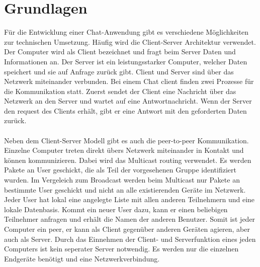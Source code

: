 \section{Grundlagen}
Für die Entwicklung einer Chat-Anwendung gibt es verschiedene Möglichkeiten zur technischen Umsetzung.
Häufig wird die Client-Server Architektur verwendet. 
Der Computer wird als Client bezeichnet und fragt beim Server Daten und Informationen an. 
Der Server ist ein leistungsstarker Computer, welcher Daten speichert und sie auf Anfrage zurück gibt.
Client und Server sind über das Netzwerk miteinander verbunden. 
Bei einem Chat client finden zwei Prozesse für die Kommunikation statt.
Zuerst sendet der Client eine Nachricht über das Netzwerk an den Server und wartet auf eine Antwortnachricht. 
Wenn der Server den request des Clients erhält, gibt er eine Antwort mit den geforderten Daten zurück. 
\cite{tanenbaum96}
\\
\\
Neben dem Client-Server Modell gibt es auch die peer-to-peer Kommunikation.
Einzelne Computer treten direkt übers Netzwerk miteinander in Kontakt und können kommunizieren.
Dabei wird das Multicast routing verwendet. Es werden Pakete an User geschickt, die als Teil der vorgesehenen Gruppe identifiziert wurden.
Im Vergeleich zum Broadcast werden beim Multicast nur Pakete an bestimmte User geschickt und nicht an alle existierenden Geräte im Netzwerk.
Jeder User hat lokal eine angelegte Liste mit allen anderen Teilnehmern und eine lokale Datenbasis. 
Kommt ein neuer User dazu, kann er einen beliebigen Teilnehmer anfragen und erhält die Namen der anderen Benutzer. 
Somit ist jeder Computer ein peer, er kann als Client gegenüber anderen Geräten agieren, aber auch als Server.
Durch das Einnehmen der Client- und Serverfunktion eines jeden Computers ist kein seperater Server notwendig.
Es werden nur die einzelnen Endgeräte benötigt und eine Netzwerkverbindung.
\cite{tanenbaum96}
